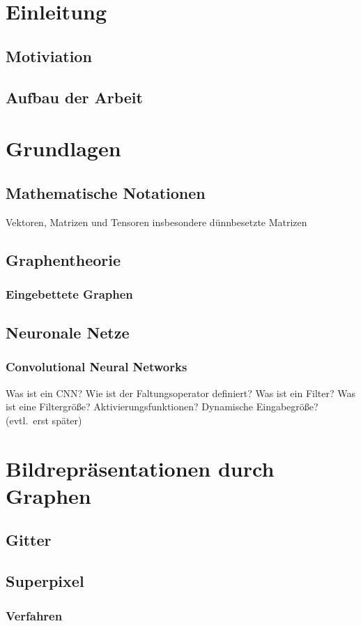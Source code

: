 \chapter{Einleitung}
\section{Motiviation}
\section{Aufbau der Arbeit}

\chapter{Grundlagen}
\section{Mathematische Notationen}
Vektoren, Matrizen und Tensoren
insbesondere dünnbesetzte Matrizen
\section{Graphentheorie}
\subsection{Eingebettete Graphen}
\section{Neuronale Netze}
\subsection{Convolutional Neural Networks}
Was ist ein CNN\@?
Wie ist der Faltungsoperator definiert?
Was ist ein Filter?
Was ist eine Filtergröße?
Aktivierungsfunktionen?
Dynamische Eingabegröße? (evtl.\ erst später)

\chapter{Bildrepräsentationen durch Graphen}
\section{Gitter}
\section{Superpixel}
\subsection{Verfahren}
